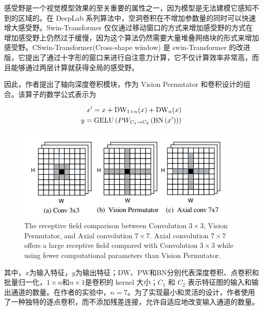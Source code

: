 \documentclass[a4paper, 10pt]{article}
\begin{document}
			感受野是一个视觉模型效果的至关重要的属性之一，因为模型是无法建模它感知不到的区域的。在 DeepLab 系列算法中，空洞卷积在不增加参数量的同时可以快速增大感受野。Swin-Transformer\cite{liu2021swin} 仅仅通过移动窗口的方式来增加感受野的方式在增加感受野上仍然过于缓慢，因为这个算法仍然需要大量堆叠网络块的形式来增加感受野。CSwin-Transformer(Cross-shape window)\cite{dong2022cswin} 是 swin-Transformer 的改进版，它提出了通过十字形的窗口来进行自注意力计算，它不仅计算效率非常高，而且能够通过两层计算就获得全局的感受野。
			
			因此，作者提出了轴向深度卷积模块，作为 Vision Permutator 和卷积设计的组合。该算子的数学公式表示为
			
			\begin{equation}
				\begin{aligned}
					x^\prime = x + \text{DW}_{1 \times n}(x) + \text{DW}_{n \time 1}(x) \\
					y = \text{GELU}\left(PW_{C_1 \rightarrow C_2} \left(\text{BN}\left(x^\prime \right)\right)\right)
				\end{aligned}
				\label{eq: Axial Depthwise Convolution module}
			\end{equation}
			
			\begin{figure}[htbp]
				\centering 
				\includegraphics[width=0.6\columnwidth]{picture/Lightweight Model/Receptive Field}
				\caption{
					\label{fig: Receptive Field} 
					The receptive field comparison between Convolution $3 \times 3$,
					Vision Permutator, and Axial convolution $7 \times 7$. Axial convolution
					$7 \times 7$ offers a large receptive field compared with Convolution
					$3 \times 3$ while using fewer computational parameters than Vision
					Permutator.
				}
			\end{figure}
			
			其中，$x$为输入特征，$y$为输出特征；DW、PW和BN分别代表深度卷积、点卷积和批量归一化，$1 \times n$和$n \times 1$是卷积的 kernel 大小；$C_1$ 和 $C_2$ 表示特征图的输入和输出通道的数量。在作者的实验中，$n=7$。为了实现最小和灵活的设计，作者使用了一种独特的逐点卷积，而不添加残差连接，允许自适应地改变输入通道的数量。
			
\end{document}
